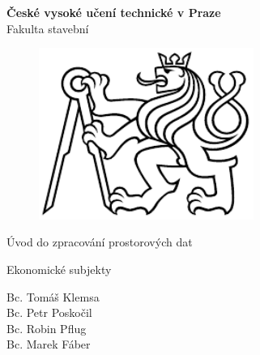 \documentclass[a4paper, 12pt]{article}
\begin{document}
\begin{titlepage}
\begin{center}
\noindent
\Large \textbf{České vysoké učení technické v Praze }\\ Fakulta stavební
\vspace{5cm}

\huge

\begin{figure}[h!]
	\centering
	\includegraphics[width=7cm]{logo.png}
\end{figure}

\vspace{0.5cm}

Úvod do zpracování prostorových dat \\

\vspace{3cm}

\Huge  
Ekonomické subjekty\\

\vspace{2cm}

\Large
Bc. Tomáš Klemsa \\
Bc. Petr Poskočil \\
Bc. Robin Pflug \\
Bc. Marek Fáber \\

\end{center}

\end{titlepage}




\pagestyle{plain}     %
\setcounter{page}{1}  %

\tableofcontents
\newpage
\end{document}
